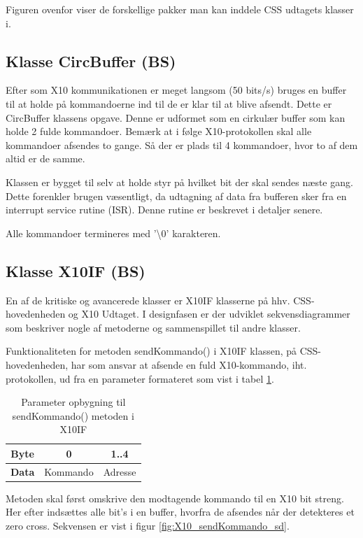 Figuren ovenfor viser de forskellige pakker man kan inddele CSS udtagets klasser i. 

\clearpage

\subsection{Klasse CircBuffer (BS)}
Efter som X10 kommunikationen er meget langsom (50 bits/s) bruges en buffer til at holde på kommandoerne ind til de er klar til at blive afsendt. Dette er CircBuffer klassens opgave.
Denne er udformet som en cirkulær buffer som kan holde 2 fulde kommandoer. Bemærk at i følge X10-protokollen skal alle kommandoer afsendes to gange. Så der er plads til 4 kommandoer, hvor to af dem altid er de samme.

Klassen er bygget til selv at holde styr på hvilket bit der skal sendes næste gang. Dette forenkler brugen væsentligt, da udtagning af data fra bufferen sker fra en interrupt service rutine (ISR). Denne rutine er beskrevet i detaljer senere.

Alle kommandoer termineres med '\textbackslash 0' karakteren. 

\subsection{Klasse X10IF (BS)}
En af de kritiske og avancerede klasser er X10IF klasserne på hhv. CSS-hovedenheden og X10 Udtaget. I designfasen er der udviklet sekvensdiagrammer som beskriver nogle af metoderne og sammenspillet til andre klasser.

Funktionaliteten for metoden sendKommando() i X10IF klassen, på CSS-hovedenheden, har som ansvar at afsende en fuld X10-kommando, iht. protokollen, ud fra en parameter formateret som vist i tabel \ref{table:X10_sendKommando_format}.

\begin{table}[h]
	\caption{Parameter opbygning til sendKommando() metoden i X10IF}
	\centering
	\begin{tabular}{|c|c|c|}
		\hline 
		\textbf{Byte} & 0 & 1..4 \\ \hline
		\textbf{Data} & Kommando & Adresse \\ 
		\hline 
	\end{tabular} 
	\label{table:X10_sendKommando_format}
\end{table}

Metoden skal først omskrive den modtagende kommando til en X10 bit streng. Her efter indsættes alle bit's i en buffer, hvorfra de afsendes når der detekteres et zero cross. 
Sekvensen er vist i figur \ref{fig:X10_sendKommando_sd}.

